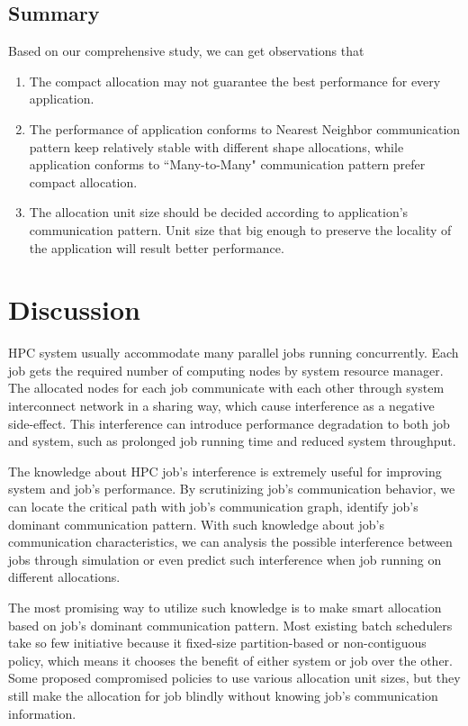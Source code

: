 \documentclass[conference]{IEEEtran}
\begin{document}
\subsection{Summary}
\label{sec:summary}

Based on our comprehensive study, we can get observations that 
\begin{enumerate}
    \item The compact allocation may not guarantee the best performance for every application. 
    \item The performance of application conforms to Nearest Neighbor communication pattern keep relatively stable with different shape allocations, while application conforms to ``Many-to-Many" communication pattern prefer compact allocation. 
    \item The allocation unit size should be decided according to application's communication pattern. Unit size that big enough to preserve the locality of the application will result better performance. 
\end{enumerate}




\section{Discussion}
\label{sec:discussion}

HPC system usually accommodate many parallel jobs running concurrently. Each job gets the required number of computing nodes by system resource manager. The allocated nodes for each job communicate with each other through system interconnect network in a sharing way, which cause interference as a negative side-effect. This interference can introduce performance degradation to both job and system, such as prolonged job running time and reduced system throughput. 

The knowledge about HPC job's interference is extremely useful for improving system and job's performance. By scrutinizing job's communication behavior, we can locate the critical path with job's communication graph, identify  job's dominant communication pattern. With such knowledge about job's communication characteristics, we can analysis the possible interference between jobs through simulation or even predict such interference when job running on different allocations. 

The most promising way to utilize such knowledge is to make smart allocation based on job's dominant communication pattern. Most existing batch schedulers take so few initiative because it fixed-size partition-based or non-contiguous policy, which means it chooses the benefit of either system or job over the other. Some proposed compromised policies \cite{lo}\cite{pascual}\cite{yang-cluster14} to use various allocation unit sizes, but they still  make the allocation for job blindly without knowing job's communication information. 
\end{document}
